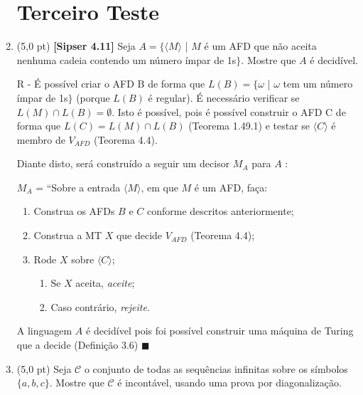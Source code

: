\documentclass[12pt,a4paper,oneside]{article}
\begin{document}
\begin{enumerate}
	
	\section*{Terceiro Teste}
	
	\item (5,0 pt)  {\bf [Sipser 4.11]}  Seja $A = \{ \langle M \rangle$ | $M$ é um AFD que não aceita nenhuma cadeia contendo um número ímpar de 1s$\}$. Mostre que $A$ é decidível.
	
	\vspace{0.3cm}
	
	{\color{blue}
		R - É possível criar o AFD B de forma que $L(B) = \{\omega$ | $\omega$ tem um número ímpar de 1s$\}$ (porque $L(B)$ é regular). É necessário  verificar se $L(M) \cap L(B) = \emptyset$. Isto é possível, pois é possível construir o AFD C de forma que $L(C) = L(M) \cap L(B)$ (Teorema 1.49.1) e testar se $\langle C \rangle$ é membro de $V_{AFD}$ (Teorema 4.4). 
		
		Diante disto, será construído a seguir um decisor $M_A$ para $A$ :
		
		$M_A$ = ``Sobre a entrada $\langle M \rangle$, em que $M$ é um AFD, faça:
		\begin{enumerate}
			\item Construa os AFDs $B$ e $C$ conforme descritos anteriormente;
			\item Construa a MT $X$ que decide $V_{AFD}$ (Teorema 4.4);
			\item Rode $X$ sobre $\langle C \rangle$;
			\begin{enumerate}
				\item Se $X$ aceita, {\it aceite};
				\item Caso contrário, {\it rejeite}.
			\end{enumerate}					
		\end{enumerate}
		
		A linguagem $A$ é decidível pois foi possível construir uma máquina de Turing que a decide (Definição 3.6) $\blacksquare$
		
	}

	\item (5,0 pt) Seja $\mathcal{C}$ o conjunto de todas as sequências infinitas sobre os símbolos $\{a, b, c\}$. Mostre que $\mathcal{C}$ é incontável, usando uma prova por diagonalização.
	
	\vspace{0.3cm}
	

\end{enumerate}
\end{document}

